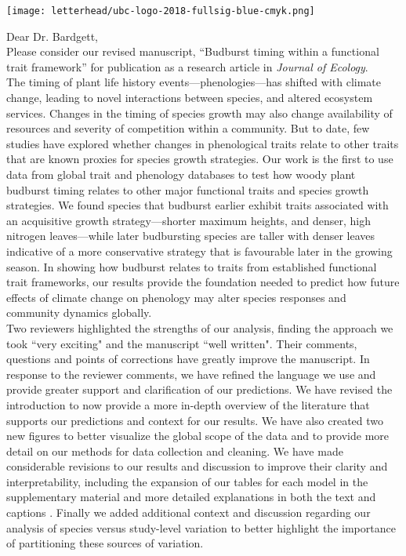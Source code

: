 \documentclass[11pt,a4paper]{article}
\begin{document}
\noindent \texttt{[image: letterhead/ubc-logo-2018-fullsig-blue-cmyk.png]}

\noindent Dear Dr. Bardgett,
\vspace{1.5ex}\\
\noindent Please consider our revised manuscript, ``Budburst timing within a functional trait framework'' for publication as a research article in \emph{Journal of Ecology}. 
\vspace{1.5ex}\\ 
\noindent The timing of plant life history events---phenologies---has shifted with climate change, leading to novel interactions between species, and altered ecosystem services. Changes in the timing of species growth may also change availability of resources and severity of competition within a community. But to date, few studies have explored whether changes in phenological traits relate to other traits that are known proxies for species growth strategies. Our work is the first to use data from global trait and phenology databases to test how woody plant budburst timing relates to other major functional traits and species growth strategies. We found species that budburst earlier exhibit traits associated with an acquisitive growth strategy---shorter maximum heights, and denser, high nitrogen leaves---while later budbursting species are taller with denser leaves indicative of a more conservative strategy that is favourable later in the growing season. In showing how budburst relates to traits from established functional trait frameworks, our results provide the foundation needed to predict how future effects of climate change on phenology may alter species responses and community dynamics globally. 
\vspace{1.5ex}\\ 
Two reviewers highlighted the strengths of our analysis, finding the approach we took ``very exciting" and the manuscript ``well written". Their comments, questions and points of corrections have greatly improve the manuscript. In response to the reviewer comments, we have refined the language we use and provide greater support and clarification of our predictions. We have revised the introduction to now provide a more in-depth overview of the literature that supports our predictions and context for our results. We have also created two new figures to better visualize the global scope of the data and to provide more detail on our methods for data collection and cleaning. We have made considerable revisions to our results and discussion to improve their clarity and interpretability, including the expansion of our tables for each model in the supplementary material and more detailed explanations in both the text and captions . Finally we added additional context and discussion regarding our analysis of species versus study-level variation to better highlight the importance of partitioning these sources of variation.
\end{document}
